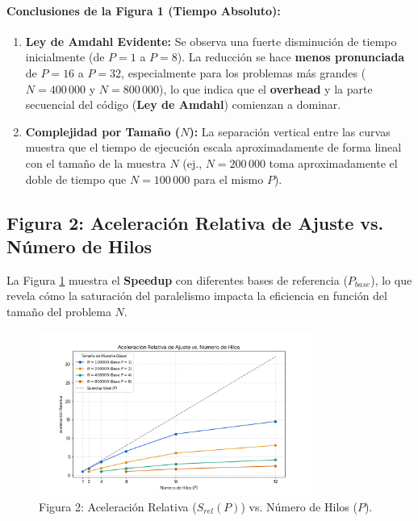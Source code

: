 \documentclass{article}
\begin{document}
\paragraph{Conclusiones de la Figura 1 (Tiempo Absoluto):}
\begin{enumerate}
    \item \textbf{Ley de Amdahl Evidente:} Se observa una fuerte disminución de tiempo inicialmente (de $P=1$ a $P=8$). La reducción se hace \textbf{menos pronunciada} de $P=16$ a $P=32$, especialmente para los problemas más grandes ($N=400\,000$ y $N=800\,000$), lo que indica que el \textbf{overhead} y la parte secuencial del código (\textbf{Ley de Amdahl}) comienzan a dominar.
    \item \textbf{Complejidad por Tamaño ($N$):} La separación vertical entre las curvas muestra que el tiempo de ejecución escala aproximadamente de forma lineal con el tamaño de la muestra $N$ (ej., $N=200\,000$ toma aproximadamente el doble de tiempo que $N=100\,000$ para el mismo $P$).
\end{enumerate}

\subsection{Figura 2: Aceleración Relativa de Ajuste vs. Número de Hilos}

La Figura \ref{fig:aceleracion_relativa} muestra el \textbf{Speedup} con diferentes bases de referencia ($P_{base}$), lo que revela cómo la saturación del paralelismo impacta la eficiencia en función del tamaño del problema $N$.

\begin{figure}[H]
    \centering
    \includegraphics[width=0.8\textwidth]{speedup_vs_n_jobs.png}
    \caption{Figura 2: Aceleración Relativa ($S_{rel}(P)$) vs. Número de Hilos ($P$).}
    \label{fig:aceleracion_relativa}
\end{figure}
\end{document}
